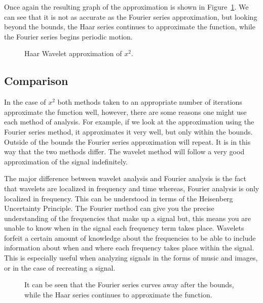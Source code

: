 \documentclass[12pt]{amsart}
\begin{document}
Once again the resulting graph of the approximation is shown in Figure~\ref{fig:haar_approx}. We can see that it is not as accurate as the Fourier series approximation, but looking beyond the bounds, the Haar series continues to approximate the function, while the Fourier series begins periodic motion.

\begin{figure}
\centering

\caption{\label{fig:haar_approx}Haar Wavelet approximation of $x^2$.}
\end{figure}

\subsection{Comparison}%
\label{sub:comparision}

In the case of $x^2$ both methods taken to an appropriate number of iterations approximate the function well, however, there are some reasons one might use each method of analysis. For example, if we look at the approximation using the Fourier series method, it approximates it very well, but only within the bounds. Outside of the bounds the Fourier series approximation will repeat. It is in this way that the two methods differ. The wavelet method will follow a very good approximation of the signal indefinitely. 

The major difference between wavelet analysis and Fourier analysis is the fact that wavelets are localized in frequency and time whereas, Fourier analysis is only localized in frequency. This can be understood in terms of the Heisenberg Uncertainty Principle. The Fourier method can give you the precise understanding of the frequencies that make up a signal but, this means you are unable to know when in the signal each frequency term takes place. Wavelets forfeit a certain amount of knowledge about the frequencies to be able to include information about when and where each frequency takes place within the signal. This is especially useful when analyzing signals in the forms of music and images, or in the case of recreating a signal.

\begin{figure}
\centering

\caption{\label{fig:extended}It can be seen that the Fourier series curves away after the bounds, while the Haar series continues to approximate the function.}
\end{figure}
\end{document}
